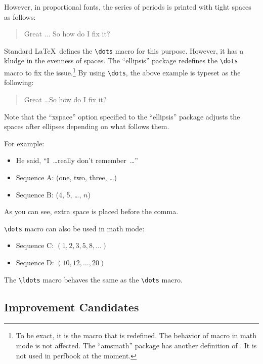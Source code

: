 However, in proportional fonts, the series of periods is printed
with tight spaces as follows:

\begin{quote}
  Great ... So how do I fix it?
\end{quote}

Standard \LaTeX\ defines the \verb|\dots| macro for this purpose.
However, it has a kludge in the evenness of spaces.
The ``ellipsis'' package redefines the \verb|\dots| macro to fix
the issue.\footnote{To be exact, it is the \co{\\textellipsis} macro
  that is redefined. The behavior of \co{\\dots} macro in math
  mode is not affected. The ``amsmath'' package has another definition
  of \co{\\dots}. It is not used in perfbook at the moment.}
By using \verb|\dots|, the above example is typeset as the following:

\begin{quote}
  Great \dots So how do I fix it?
\end{quote}

Note that the ``xspace'' option specified to the ``ellipsis'' package
adjusts the spaces after ellipses depending on what follows them.

For example:

\begin{itemize}[itemsep=.2ex]
\item He said, ``I~\dots really don't remember~\dots''
\item Sequence A: (one, two, three, \dots)
\item Sequence B: (4, 5, \dots, $n$)
\end{itemize}

As you can see, extra space is placed before the comma.

\verb|\dots| macro can also be used in math mode:

\begin{itemize}[itemsep=.2ex]
\item Sequence C: $(1, 2, 3, 5, 8, \dots)$
\item Sequence D: $(10, 12, \dots, 20)$
\end{itemize}

The \verb|\ldots| macro behaves the same as the \verb|\dots| macro.

\subsection{Improvement Candidates}
\label{sec:app:styleguide:Improvement Candidates}

